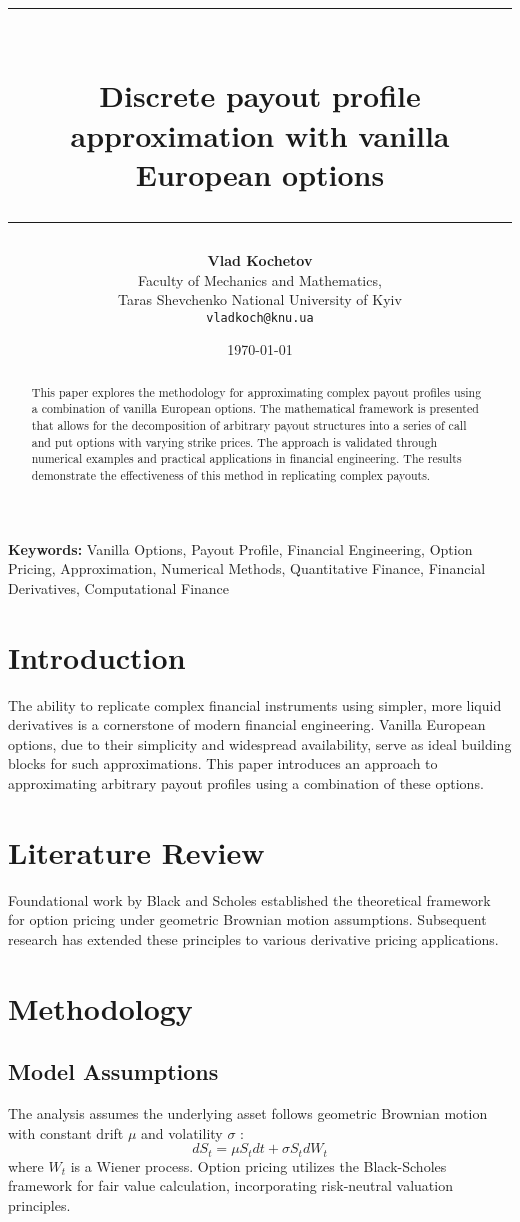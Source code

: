 \documentclass[12pt]{article}
\title{\rule{\textwidth}{4pt}\\[0.5cm]
\textbf{Discrete payout profile approximation with vanilla European options}\\[0.5cm]
\rule{\textwidth}{2pt}}
\author{\small \textbf{Vlad Kochetov} \\
    \small Faculty of Mechanics and Mathematics, \\
    \small Taras Shevchenko National University of Kyiv \\
    \small \texttt{vladkoch@knu.ua}
}
\date{\today}
\providecommand{\keywords}[1]{\textbf{Keywords:} #1}
\begin{document}
\maketitle

\begin{abstract}
This paper explores the methodology for approximating complex payout profiles using a
combination of vanilla European options. The mathematical framework is presented that
allows for the decomposition of arbitrary payout structures into a series of call and
put options with varying strike prices. The approach is validated through numerical
examples and practical applications in financial engineering. The results demonstrate
the effectiveness of this method in replicating complex payouts.
\end{abstract}

\newpage

\keywords{
    \small{
        Vanilla Options, 
        Payout Profile, 
        Financial Engineering, 
        Option Pricing, 
        Approximation, 
        Numerical Methods,
        Quantitative Finance,
        Financial Derivatives,
        Computational Finance
    }
}

\section{Introduction}
The ability to replicate complex financial instruments using simpler, more liquid
derivatives is a cornerstone of modern financial engineering. Vanilla European options,
due to their simplicity and widespread availability, serve as ideal building blocks
for such approximations. This paper introduces an approach to approximating arbitrary
payout profiles using a combination of these options.

\section{Literature Review}
Foundational work by Black and Scholes \cite{black1973pricing} established the theoretical framework for option pricing under geometric Brownian motion assumptions. Subsequent research has extended these principles to various derivative pricing applications.

\section{Methodology}
\subsection{Model Assumptions}
The analysis assumes the underlying asset follows geometric Brownian motion with constant drift $\mu$ and volatility $\sigma$ \cite{black1973pricing}:
\begin{equation}
dS_t = \mu S_t dt + \sigma S_t dW_t
\end{equation}
where $W_t$ is a Wiener process. Option pricing utilizes the Black-Scholes framework \cite{black1973pricing} for fair value calculation, incorporating risk-neutral valuation principles.
\end{document}
